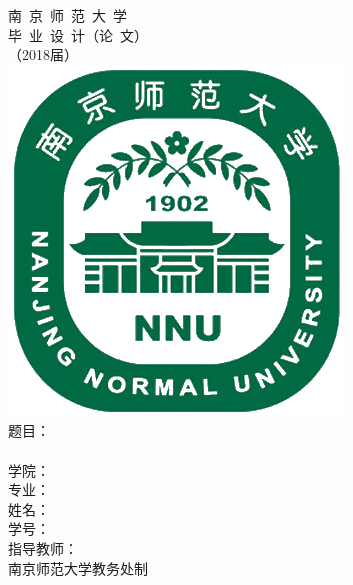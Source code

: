 \documentclass[a4paper]{ctexart}
\begin{document}
\pagestyle{empty}
\begin{titlepage}\centering\vspace*{3ex}
	{\LARGE\lishu 南\ 京\ 师\ 范\ 大\ 学}\vspace{4ex}\\%
	{ \heiti 毕\  业\ 设\ 计（论\ 文）}\vspace{3ex}\\ %
	{\Huge\heiti （2018届）}\\\vspace{8ex}%
	\includegraphics[scale=.35]{Nanjing_Normal_University_logo}\vspace{8ex}\\ 
	{\Large
		{\heiti 题\phantom{题目}目：}\uline{}\medskip\\
		\hspace{2.6cm}\uline{}\medskip\\
		{\heiti 学\phantom{学院}院：}\uline{}\medskip\\
		{\heiti 专\phantom{专业}业：}\uline{}\medskip\\
		{\heiti 姓\phantom{姓名}名：}\uline{}\medskip\\
		{\heiti 学\phantom{学号}号：}\uline{}\medskip\\
		{\heiti 指导教师：}\uline{}\\\vspace{8ex}
		{\heiti 南京师范大学教务处\phantom{空}制}
	}
\end{titlepage}
\end{document}
